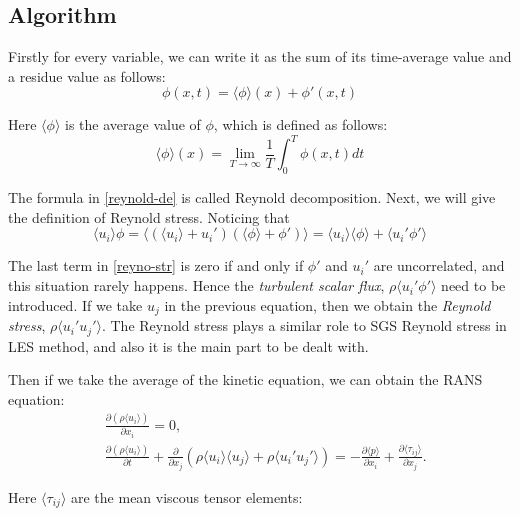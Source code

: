\documentclass[english, nochinese]{pkupaper}
\begin{document}
\subsection{Algorithm}
\par Firstly for every variable, we can write it as the sum of its time-average value and a residue value as follows:
\begin{equation}\label{reynold-de}
	\phi(x, t) = \langle\phi\rangle(x) + \phi'(x, t)
\end{equation}
\par Here $\langle\phi\rangle$ is the average value of $\phi$, which is defined as follows:
\begin{equation}
	\langle\phi\rangle(x) = \lim_{T\to\infty}\frac{1}{T}\int_0^T\phi(x, t)dt
\end{equation}
\par The formula in \eqref{reynold-de} is called Reynold decomposition. Next, we will give the definition of Reynold stress. Noticing that
\begin{equation}\label{reyno-str}
	\langle u_i\rangle\phi = \langle(\langle u_i\rangle+u_i')(\langle\phi\rangle+\phi')\rangle = \langle u_i\rangle\langle\phi\rangle + \langle u_i'\phi'\rangle
\end{equation}
\par The last term in \eqref{reyno-str} is zero if and only if $\phi'$ and $u_i'$ are uncorrelated, and this situation rarely happens. Hence the \emph{turbulent scalar flux}, $\rho\langle u_i'\phi'\rangle$ need to be introduced. If we take $u_j$ in the previous equation, then we obtain the \emph{Reynold stress}, $\rho\langle u_i'u_j'\rangle$. The Reynold stress plays a similar role to SGS Reynold stress in LES method, and also it is the main part to be dealt with.
\par Then if we take the average of the kinetic equation, we can obtain the RANS equation:
\begin{equation}
	\begin{aligned}
		& \frac{\partial(\rho\langle u_i\rangle)}{\partial x_i} = 0,\\
		& \frac{\partial(\rho\langle u_i\rangle)}{\partial t} + \frac{\partial}{\partial x_j}\left(\rho\langle u_i\rangle\langle u_j\rangle + \rho\langle u_i'u_j'\rangle\right) = -\frac{\partial\langle p\rangle}{\partial x_i} + \frac{\partial\langle\tau_{ij}\rangle}{\partial x_j}.
	\end{aligned}
\end{equation}
\par Here $\langle\tau_{ij}\rangle$ are the mean viscous tensor elements:
\end{document}
